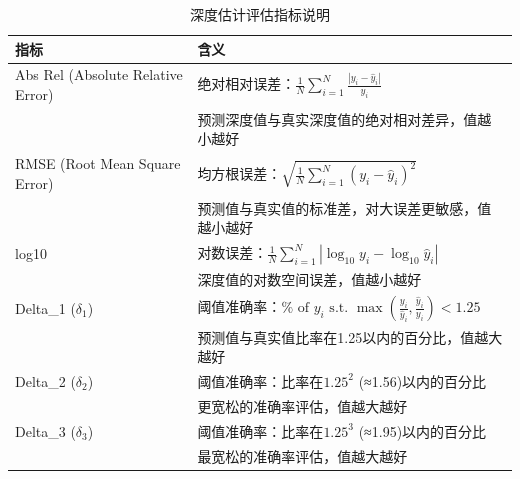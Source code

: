 \documentclass{article}
\begin{document}
\begin{table}[h!]
    \centering
    \label{tab:metrics_explanation}
    \begin{tabular}{lp{8cm}}
        \toprule
        \textbf{指标} & \textbf{含义} \\
        \midrule
        Abs Rel (Absolute Relative Error) & 绝对相对误差：$\frac{1}{N}\sum_{i=1}^N \frac{|y_i - \hat{y}_i|}{y_i}$ \\
        & 预测深度值与真实深度值的绝对相对差异，值越小越好 \\[0.5em]
        
        RMSE (Root Mean Square Error) & 均方根误差：$\sqrt{\frac{1}{N}\sum_{i=1}^N (y_i - \hat{y}_i)^2}$ \\
        & 预测值与真实值的标准差，对大误差更敏感，值越小越好 \\[0.5em]
        
        log10 & 对数误差：$\frac{1}{N}\sum_{i=1}^N |\log_{10} y_i - \log_{10} \hat{y}_i|$ \\
        & 深度值的对数空间误差，值越小越好 \\[0.5em]
        
        Delta\_1 ($\delta_1$) & 阈值准确率：$\% \text{ of } y_i \text{ s.t. } \max(\frac{y_i}{\hat{y}_i}, \frac{\hat{y}_i}{y_i}) < 1.25$ \\
        & 预测值与真实值比率在1.25以内的百分比，值越大越好 \\[0.5em]
        
        Delta\_2 ($\delta_2$) & 阈值准确率：比率在$1.25^2$ (≈1.56)以内的百分比 \\
        & 更宽松的准确率评估，值越大越好 \\[0.5em]
        
        Delta\_3 ($\delta_3$) & 阈值准确率：比率在$1.25^3$ (≈1.95)以内的百分比 \\
        & 最宽松的准确率评估，值越大越好 \\
        \bottomrule
    \end{tabular}
    \caption{深度估计评估指标说明}
\end{table}
\end{document}
